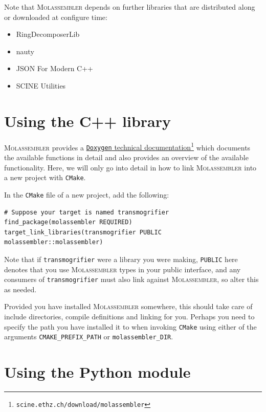 \documentclass[]{tufte-book}
\begin{document}
Note that \textsc{Molassembler} depends on further libraries that are
distributed along or downloaded at configure time:

\begin{itemize}
  \item RingDecomposerLib~\cite{Flachsenberg2017, Kolodzik2012} 
  \item nauty~\cite{McKay2014}
  \item JSON For Modern C++~\cite{Lohmann2013} 
  \item SCINE Utilities~\cite{Brunken2019}
\end{itemize}


\chapter{Using the C++ library}

\textsc{Molassembler} provides a
\href{https://scine.ethz.ch/static/download/documentation/molassembler/v3.0.1/cpp}{\texttt{Doxygen}
technical
documentation}\footnote{\texttt{scine.ethz.ch/download/molassembler}}
which documents the available functions in detail and also provides an overview
of the available functionality. Here, we will only go into detail in how to link
\textsc{Molassembler} into a new project with \texttt{CMake}.

In the \texttt{CMake} file of a new project, add the following:

\begin{Verbatim}
# Suppose your target is named transmogrifier
find_package(molassembler REQUIRED)
target_link_libraries(transmogrifier PUBLIC molassembler::molassembler)
\end{Verbatim}

Note that if \texttt{transmogrifier} were a library you were making,
\texttt{PUBLIC} here denotes that you use \textsc{Molassembler} types in your
public interface, and any consumers of \texttt{transmogrifier} must also link
against \textsc{Molassembler}, so alter this as needed.

Provided you have installed \textsc{Molassembler} somewhere, this should take
care of include directories, compile definitions and linking for you. Perhaps
you need to specify the path you have installed it to when invoking
\texttt{CMake} using either of the arguments \texttt{CMAKE\_PREFIX\_PATH} or
\texttt{molassembler\_DIR}.

\newpage
\chapter{Using the Python module}
\end{document}
